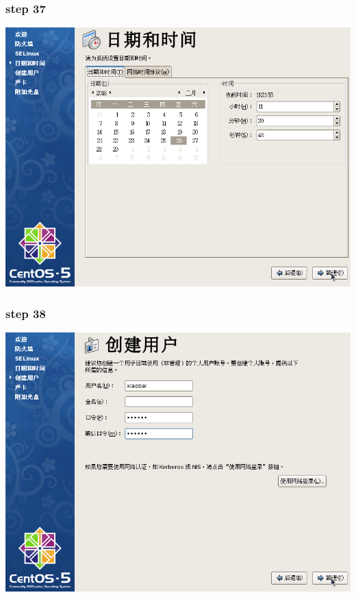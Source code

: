 \documentclass[xcolor=svgnames,presentation]{beamer}
\begin{document}
\begin{frame}
\frametitle{step 37}
\label{sec-2-37}

\begin{center}
\includegraphics[width=.9\linewidth]{img/img59.png}
\end{center}
\end{frame}
\begin{frame}
\frametitle{step 38}
\label{sec-2-38}

\begin{center}
\includegraphics[width=.9\linewidth]{img/img60.png}
\end{center}
\end{frame}
\end{document}
